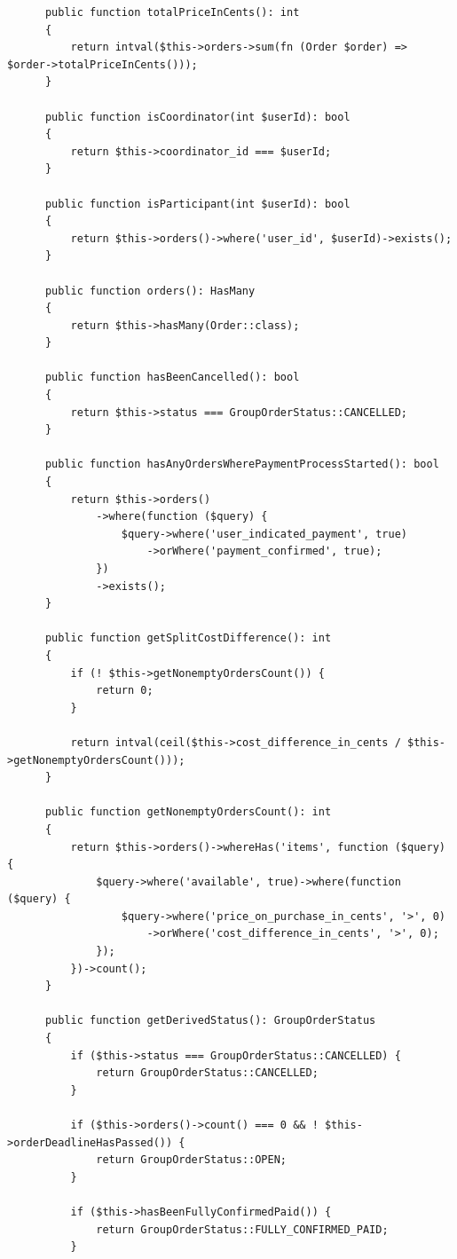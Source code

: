 \begin{verbatim}
      public function totalPriceInCents(): int
      {
          return intval($this->orders->sum(fn (Order $order) => $order->totalPriceInCents()));
      }
  
      public function isCoordinator(int $userId): bool
      {
          return $this->coordinator_id === $userId;
      }
  
      public function isParticipant(int $userId): bool
      {
          return $this->orders()->where('user_id', $userId)->exists();
      }
  
      public function orders(): HasMany
      {
          return $this->hasMany(Order::class);
      }
  
      public function hasBeenCancelled(): bool
      {
          return $this->status === GroupOrderStatus::CANCELLED;
      }
  
      public function hasAnyOrdersWherePaymentProcessStarted(): bool
      {
          return $this->orders()
              ->where(function ($query) {
                  $query->where('user_indicated_payment', true)
                      ->orWhere('payment_confirmed', true);
              })
              ->exists();
      }
  
      public function getSplitCostDifference(): int
      {
          if (! $this->getNonemptyOrdersCount()) {
              return 0;
          }
  
          return intval(ceil($this->cost_difference_in_cents / $this->getNonemptyOrdersCount()));
      }
  
      public function getNonemptyOrdersCount(): int
      {
          return $this->orders()->whereHas('items', function ($query) {
              $query->where('available', true)->where(function ($query) {
                  $query->where('price_on_purchase_in_cents', '>', 0)
                      ->orWhere('cost_difference_in_cents', '>', 0);
              });
          })->count();
      }
  
      public function getDerivedStatus(): GroupOrderStatus
      {
          if ($this->status === GroupOrderStatus::CANCELLED) {
              return GroupOrderStatus::CANCELLED;
          }
  
          if ($this->orders()->count() === 0 && ! $this->orderDeadlineHasPassed()) {
              return GroupOrderStatus::OPEN;
          }
  
          if ($this->hasBeenFullyConfirmedPaid()) {
              return GroupOrderStatus::FULLY_CONFIRMED_PAID;
          }
  

\end{verbatim}
